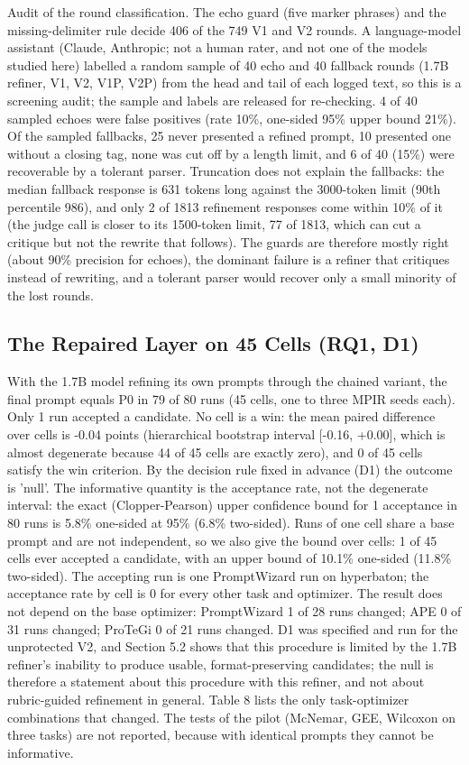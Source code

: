 \documentclass{ieeeaccess}
\begin{document}
Audit of the round classification. The echo guard (five marker phrases) and the missing-delimiter rule decide 406 of the 749 V1 and V2 rounds. A language-model assistant (Claude, Anthropic; not a human rater, and not one of the models studied here) labelled a random sample of 40 echo and 40 fallback rounds (1.7B refiner, V1, V2, V1P, V2P) from the head and tail of each logged text, so this is a screening audit; the sample and labels are released for re-checking. 4 of 40 sampled echoes were false positives (rate 10\%, one-sided 95\% upper bound 21\%). Of the sampled fallbacks, 25 never presented a refined prompt, 10 presented one without a closing tag, none was cut off by a length limit, and 6 of 40 (15\%) were recoverable by a tolerant parser. Truncation does not explain the fallbacks: the median fallback response is 631 tokens long against the 3000-token limit (90th percentile 986), and only 2 of 1813 refinement responses come within 10\% of it (the judge call is closer to its 1500-token limit, 77 of 1813, which can cut a critique but not the rewrite that follows). The guards are therefore mostly right (about 90\% precision for echoes), the dominant failure is a refiner that critiques instead of rewriting, and a tolerant parser would recover only a small minority of the lost rounds.

\subsection{The Repaired Layer on 45 Cells (RQ1, D1)}

With the 1.7B model refining its own prompts through the chained variant, the final prompt equals P0 in 79 of 80 runs (45 cells, one to three MPIR seeds each). Only 1 run accepted a candidate. No cell is a win: the mean paired difference over cells is -0.04 points (hierarchical bootstrap interval [-0.16, +0.00], which is almost degenerate because 44 of 45 cells are exactly zero), and 0 of 45 cells satisfy the win criterion. By the decision rule fixed in advance (D1) the outcome is 'null'. The informative quantity is the acceptance rate, not the degenerate interval: the exact (Clopper-Pearson) upper confidence bound for 1 acceptance in 80 runs is 5.8\% one-sided at 95\% (6.8\% two-sided). Runs of one cell share a base prompt and are not independent, so we also give the bound over cells: 1 of 45 cells ever accepted a candidate, with an upper bound of 10.1\% one-sided (11.8\% two-sided). The accepting run is one PromptWizard run on hyperbaton; the acceptance rate by cell is 0 for every other task and optimizer. The result does not depend on the base optimizer: PromptWizard 1 of 28 runs changed; APE 0 of 31 runs changed; ProTeGi 0 of 21 runs changed. D1 was specified and run for the unprotected V2, and Section 5.2 shows that this procedure is limited by the 1.7B refiner's inability to produce usable, format-preserving candidates; the null is therefore a statement about this procedure with this refiner, and not about rubric-guided refinement in general. Table 8 lists the only task-optimizer combinations that changed. The tests of the pilot (McNemar, GEE, Wilcoxon on three tasks) are not reported, because with identical prompts they cannot be informative.
\end{document}
